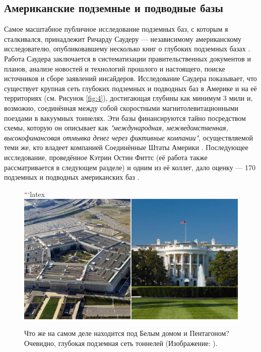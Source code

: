 \documentclass[10pt,twocolumn,letterpaper]{article}
\begin{document}
\subsection{Американские подземные и подводные базы}

Самое масштабное публичное исследование подземных баз, с которым я сталкивался, принадлежит Ричарду Саудеру — независимому американскому исследователю, опубликовавшему несколько книг о глубоких подземных базах \cite{22}. Работа Саудера заключается в систематизации правительственных документов и планов, анализе новостей и технологий прошлого и настоящего, поиске источников и сборе заявлений инсайдеров. Исследование Саудера показывает, что существует крупная сеть глубоких подземных и подводных баз в Америке и на её территориях (см. Рисунок \ref{fig:4}), достигающая глубины как минимум 3 мили и, возможно, соединённая между собой скоростными магнитолевитационными поездами в вакуумных тоннелях. Эти базы финансируются тайно посредством схемы, которую он описывает как \textit{"международная, межведомственная, высокофинансовая отмывка денег через фиктивные компании"}, осуществляемой теми же, кто владеет компанией Соединённые Штаты Америки \cite{22}. Последующее исследование, проведённое Кэтрин Остин Фиттс (её работа также рассматривается в следующем разделе) и одним из её коллег, дало оценку — 170 подземных и подводных американских баз \cite{16,20}.

\begin{figure}[b]
\begin{center}
```latex
   \includegraphics[width=1\linewidth]{penta.jpg}
\end{center}
   \caption{Что же на самом деле находится под Белым домом и Пентагоном? Очевидно, глубокая подземная сеть тоннелей (Изображение: \cite{31}).}
\label{fig:3}
\label{fig:onecol}
\end{figure}
\end{document}
